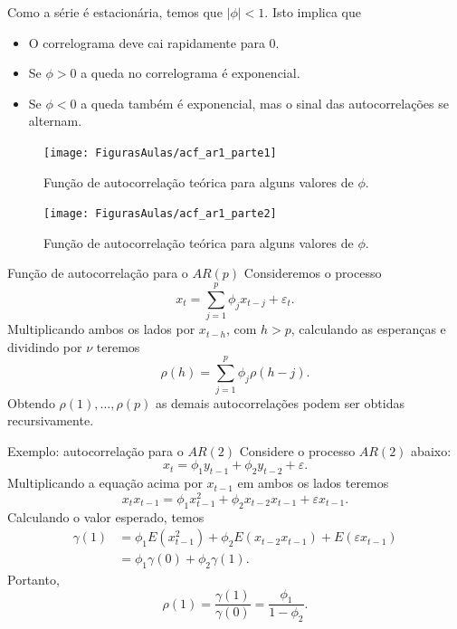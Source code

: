 \documentclass[
  letterpaper,
  DIV=11,
  numbers=noendperiod]{scrreprt}
\theoremstyle{definition}
\theoremstyle{plain}
\theoremstyle{definition}
\theoremstyle{plain}
\theoremstyle{remark}
\begin{document}
\begin{frame}
    Como a série é estacionária, temos que $|\phi|<1$.  Isto implica que
    \begin{itemize}
        \item O correlograma deve cai rapidamente para 0.
        \item Se $\phi>0$ a queda no correlograma é exponencial.
        \item Se $\phi<0$ a queda também é exponencial, mas o sinal das autocorrelações se alternam.
    \end{itemize}
\end{frame}

\begin{frame}
\begin{figure}
\centering
\texttt{[image: FigurasAulas/acf\_ar1\_parte1]}
\caption{Função de autocorrelação teórica para alguns valores de $\phi$.}
\label{fig:acf_ar1_parte1}
\end{figure}
\end{frame}

\begin{frame}
    \begin{figure}
        \centering
        \texttt{[image: FigurasAulas/acf\_ar1\_parte2]}
        \caption{Função de autocorrelação teórica para alguns valores de $\phi$.}
        \label{fig:acf_ar1_parte2}
    \end{figure}
\end{frame}

\begin{frame}{Função de autocorrelação para o $AR(p)$}
    Consideremos o processo 
    $$x_t = \sum_{j=1}^p\phi_j x_{t-j}+\varepsilon_t.$$
    Multiplicando ambos os lados por $x_{t-h}$, com $h>p$, calculando as esperanças e dividindo por $\nu$ teremos
    \begin{equation}
    \rho(h)=\sum_{j=1}^p\phi_j \rho(h-j).\label{eq::acf_arp}
    \end{equation}
        Obtendo $\rho(1),\ldots,\rho(p)$ as demais autocorrelações podem ser obtidas recursivamente.
\end{frame}

\begin{frame}{Exemplo: autocorrelação para o $AR(2)$}
    Considere o processo $AR(2)$ abaixo:
    $$x_{t}=\phi_1y_{t-1}+\phi_2y_{t-2}+\varepsilon.$$
    Multiplicando a equação acima por $x_{t-1}$ em ambos os lados teremos
    $$x_{t}x_{t-1}=\phi_1x_{t-1}^2+\phi_2x_{t-2}x_{t-1}+\varepsilon x_{t-1}.$$
    Calculando o valor esperado, temos
    \begin{align*}
    \gamma(1)&=\phi_1E(x_{t-1}^2)+\phi_2E(x_{t-2}x_{t-1})+E(\varepsilon x_{t-1})\\
    &=\phi_1\gamma(0) + \phi_2\gamma(1).
    \end{align*}
    Portanto,
    $$\rho(1)=\frac{\gamma(1)}{\gamma(0)}=\frac{\phi_1}{1-\phi_2}.$$
\end{frame}
\end{document}
